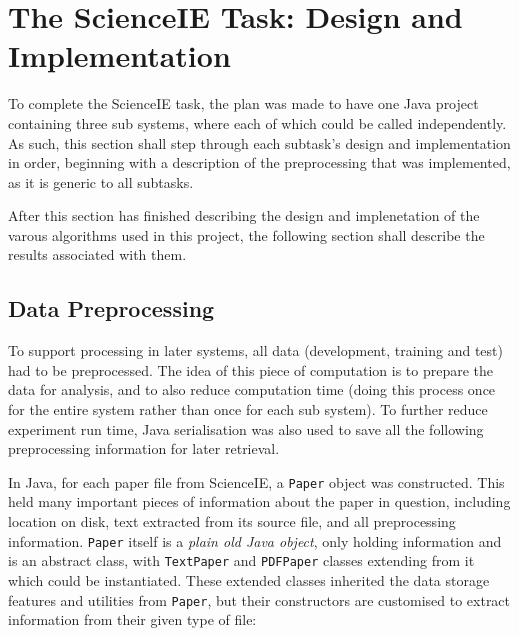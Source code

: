 \chapter{The ScienceIE Task: Design and Implementation}

To complete the ScienceIE task, the plan was made to have one Java project containing three sub systems, where each of which could be called independently. As such, this section shall step through each subtask's design and implementation in order, beginning with a description of the preprocessing that was implemented, as it is generic to all subtasks.

After this section has finished describing the design and implenetation of the varous algorithms used in this project, the following section shall describe the results associated with them.

\section{Data Preprocessing}
To support processing in later systems, all data (development, training and test) had to be preprocessed. The idea of this piece of computation is to prepare the data for analysis, and to also reduce computation time (doing this process once for the entire system rather than once for each sub system). To further reduce experiment run time, Java serialisation was also used to save all the following preprocessing information for later retrieval.

In Java, for each paper file from ScienceIE, a \texttt{Paper} object was constructed. This held many important pieces of information about the paper in question, including location on disk, text extracted from its source file, and all preprocessing information. \texttt{Paper} itself is a \textit{plain old Java object}, only holding information and is an abstract class, with \texttt{TextPaper} and \texttt{PDFPaper} classes extending from it which could be instantiated. These extended classes inherited the data storage features and utilities from \texttt{Paper}, but their constructors are customised to extract information from their given type of file:

